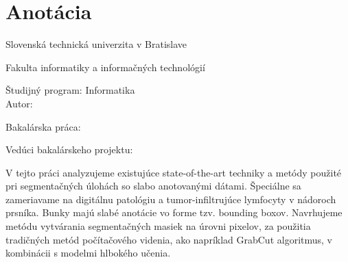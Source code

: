 

\newpage{}\thispagestyle{empty}



\thispagestyle{empty}
\section*{Anotácia}

\begin{minipage}[t]{1\columnwidth}%
Slovenská technická univerzita v Bratislave

Fakulta informatiky a informačných technológií

Študijný program: Informatika\\

Autor: \myName

Bakalárska práca: \myTitle

Vedúci bakalárskeho projektu: \mySupervisor

\myDateSK%
\end{minipage}

\bigskip{}

V tejto práci analyzujeme existujúce state-of-the-art techniky a metódy použité pri segmentačných úlohách so slabo anotovanými dátami. Špeciálne sa zameriavame na digitálnu patológiu a tumor-infiltrujúce lymfocyty v nádoroch prsníka. Bunky majú slabé anotácie vo forme tzv. bounding boxov. Navrhujeme metódu vytvárania segmentačných masiek na úrovni pixelov, za použitia tradičných metód počítačového videnia, ako napríklad GrabCut algoritmus, v kombinácii s modelmi hlbokého učenia.



\newpage{}\thispagestyle{empty}\medskip{}


\newpage{}



\newpage

